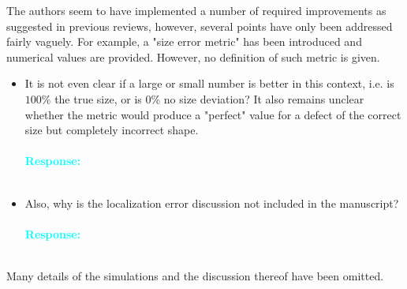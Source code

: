 \documentclass[11pt,a2paper]{report}
\begin{document}
	The authors seem to have implemented a number of required improvements as suggested in previous reviews, however, several points have only been addressed fairly vaguely. 
	For example, a "size error metric" has been introduced and numerical values are provided. 
	However, no definition of such metric is given. 
	\begin{itemize}
		\item It is not even clear if a large or small number is better in this context, i.e. is \(100\%\) the true size, or is \(0\%\) no size deviation? It also remains unclear whether the metric would produce a "perfect" value for a defect of the correct size but completely incorrect shape. 
			\\ \\
		\textcolor{Cyan}{
			\textbf{Response:}}
		\\ \\
		\item Also, why is the localization error discussion not included in the manuscript?
			\\ \\
		\textcolor{Cyan}{
			\textbf{Response:}}
		\\ \\
	\end{itemize}
	
	Many details of the simulations and the discussion thereof have been omitted. 
	
\end{document}
